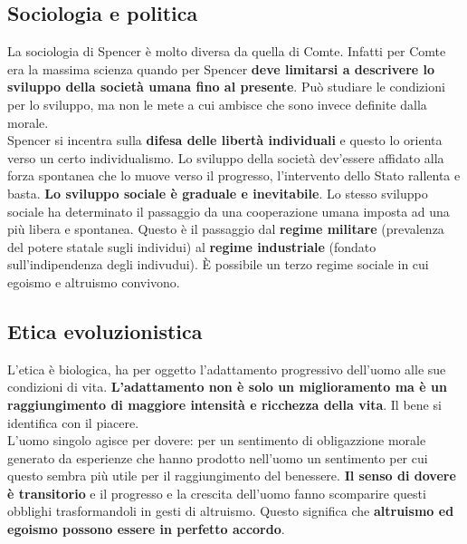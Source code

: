 \subsection{Sociologia e politica}
La sociologia di Spencer è molto diversa da quella di Comte. Infatti per Comte era la massima scienza
quando per Spencer \textbf{deve limitarsi a descrivere lo sviluppo della società umana fino al
presente}. Può studiare le condizioni per lo sviluppo, ma non le mete a cui ambisce che sono invece
definite dalla morale.\\ [\baselineskip]
Spencer si incentra sulla \textbf{difesa delle libertà individuali} e questo lo orienta verso un 
certo individualismo. Lo sviluppo della società dev'essere affidato alla forza spontanea che lo muove
verso il progresso, l'intervento dello Stato rallenta e basta. \textbf{Lo sviluppo sociale è graduale
e inevitabile}. Lo stesso sviluppo sociale ha determinato il passaggio da una cooperazione umana
imposta ad una più libera e spontanea. Questo è il passaggio dal \textbf{regime militare} (prevalenza
del potere statale sugli individui) al \textbf{regime industriale} (fondato sull'indipendenza degli
indivudui). È possibile un terzo regime sociale in cui egoismo e altruismo convivono. 

\subsection{Etica evoluzionistica}
L'etica è biologica, ha per oggetto l'adattamento progressivo dell'uomo alle sue condizioni di vita.
\textbf{L'adattamento non è solo un miglioramento ma è un raggiungimento di maggiore intensità e 
ricchezza della vita}. Il bene si identifica con il piacere.\\
L'uomo singolo agisce per dovere: per un sentimento di obligazzione morale generato da esperienze che
hanno prodotto nell'uomo un sentimento per cui questo sembra più utile per il raggiungimento del 
benessere. \textbf{Il senso di dovere è transitorio} e il progresso e la crescita dell'uomo fanno
scomparire questi obblighi trasformandoli in gesti di altruismo. Questo significa che 
\textbf{altruismo ed egoismo possono essere in perfetto accordo}. 
